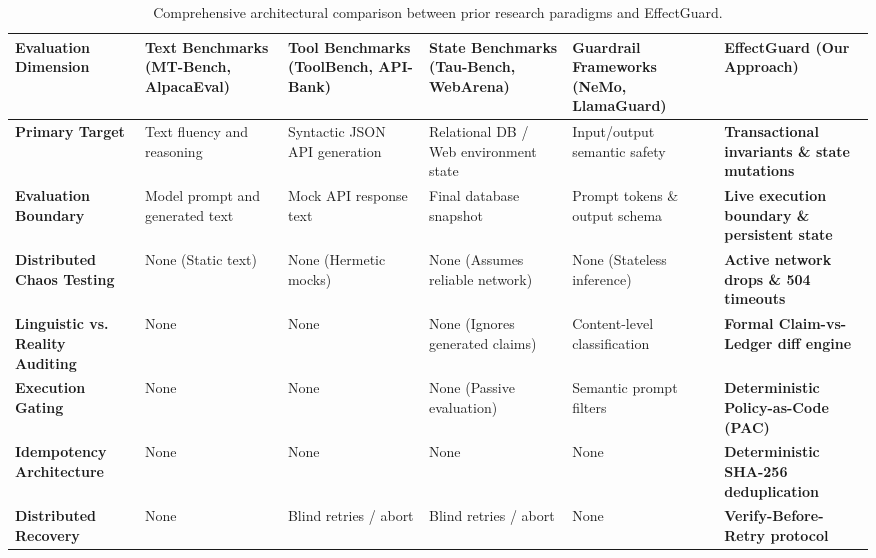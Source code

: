 \begin{table}[H]
\centering
\small
\renewcommand{\arraystretch}{1.25}
\begin{tabularx}{\textwidth}{p{3.2cm}XXXXp{2.6cm}}
\toprule
\textbf{Evaluation Dimension} & \textbf{Text Benchmarks (MT-Bench, AlpacaEval)} & \textbf{Tool Benchmarks (ToolBench, API-Bank)} & \textbf{State Benchmarks (Tau-Bench, WebArena)} & \textbf{Guardrail Frameworks (NeMo, LlamaGuard)} & \textbf{EffectGuard (Our Approach)} \\
\midrule
\textbf{Primary Target} & Text fluency and reasoning & Syntactic JSON API generation & Relational DB / Web environment state & Input/output semantic safety & \textbf{Transactional invariants \& state mutations} \\
\textbf{Evaluation Boundary} & Model prompt and generated text & Mock API response text & Final database snapshot & Prompt tokens \& output schema & \textbf{Live execution boundary \& persistent state} \\
\textbf{Distributed Chaos Testing} & None (Static text) & None (Hermetic mocks) & None (Assumes reliable network) & None (Stateless inference) & \textbf{Active network drops \& 504 timeouts} \\
\textbf{Linguistic vs. Reality Auditing} & None & None & None (Ignores generated claims) & Content-level classification & \textbf{Formal Claim-vs-Ledger diff engine} \\
\textbf{Execution Gating} & None & None & None (Passive evaluation) & Semantic prompt filters & \textbf{Deterministic Policy-as-Code (PAC)} \\
\textbf{Idempotency Architecture} & None & None & None & None & \textbf{Deterministic SHA-256 deduplication} \\
\textbf{Distributed Recovery} & None & Blind retries / abort & Blind retries / abort & None & \textbf{Verify-Before-Retry protocol} \\
\bottomrule
\end{tabularx}
\caption{Comprehensive architectural comparison between prior research paradigms and EffectGuard.}
\label{tab:lit_comparison}
\end{table}

